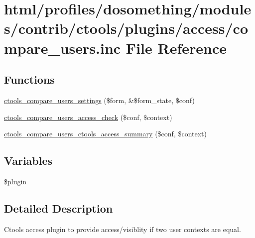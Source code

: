 \hypertarget{compare__users_8inc}{
\section{html/profiles/dosomething/modules/contrib/ctools/plugins/access/compare\_\-users.inc File Reference}
\label{compare__users_8inc}
}
\subsection*{Functions}
\begin{DoxyCompactItemize}
\item 
\hyperlink{compare__users_8inc_af3b8eb77737a7faf1968b2e43937fd7e}{ctools\_\-compare\_\-users\_\-settings} (\$form, \&\$form\_\-state, \$conf)
\item 
\hyperlink{compare__users_8inc_a99588e3a4b2aca3600c012d023946f59}{ctools\_\-compare\_\-users\_\-access\_\-check} (\$conf, \$context)
\item 
\hyperlink{compare__users_8inc_abdbf94f4ca0174cc454de896d28212d6}{ctools\_\-compare\_\-users\_\-ctools\_\-access\_\-summary} (\$conf, \$context)
\end{DoxyCompactItemize}
\subsection*{Variables}
\begin{DoxyCompactItemize}
\item 
\hyperlink{compare__users_8inc_ada8a7130088351710bb02ed622d6bf65}{\$plugin}
\end{DoxyCompactItemize}


\subsection{Detailed Description}
Ctools access plugin to provide access/visiblity if two user contexts are equal. 

